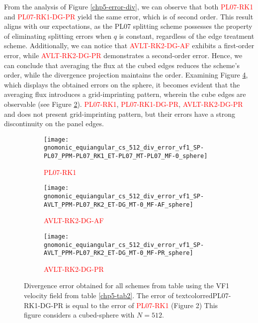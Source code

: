 From the analysis of Figure \ref{chp5-error-div}, we can observe that both \textcolor{red}{PL07-RK1} and \textcolor{red}{PL07-RK1-DG-PR} yield the same error,
which is of second order. This result aligns with our expectations, as the PL07 splitting scheme possesses the property of eliminating
splitting errors when $q$ is constant, regardless of the edge treatment scheme.
Additionally, we can notice that \textcolor{red}{AVLT-RK2-DG-AF} exhibits a first-order error, while \textcolor{red}{AVLT-RK2-DG-PR} demonstrates a second-order error.
Hence, we can conclude that averaging the flux at the cubed edges reduces the scheme's order, while the divergence projection maintains the order.
Examining Figure \ref{chp5-div}, which displays the obtained errors on the sphere, it becomes evident that the averaging
flux introduces a grid-imprinting pattern, wherein the cube edges are observable (see Figure \ref{chp5-div2}).
\textcolor{red}{PL07-RK1}, \textcolor{red}{PL07-RK1-DG-PR}, \textcolor{red}{AVLT-RK2-DG-PR} and  does not present grid-imprinting pattern, but their errors have a strong discontinuity on the panel edges.
\begin{figure}[!htb]
	\centering
	\begin{subfigure}{0.3\textwidth}
		\centering
		\texttt{[image: gnomonic\_equiangular\_cs\_512\_div\_error\_vf1\_SP-PL07\_PPM-PL07\_RK1\_ET-PL07\_MT-PL07\_MF-0\_sphere]}
		\caption{\textcolor{red}{PL07-RK1} \label{chp5-div1}}
	\end{subfigure}
	\begin{subfigure}{0.3\textwidth}
	\centering
	\texttt{[image: gnomonic\_equiangular\_cs\_512\_div\_error\_vf1\_SP-AVLT\_PPM-PL07\_RK2\_ET-DG\_MT-0\_MF-AF\_sphere]}
	\caption{\textcolor{red}{AVLT-RK2-DG-AF} \label{chp5-div2}}
	\end{subfigure}
	\begin{subfigure}{0.3\textwidth}
	\centering
	\texttt{[image: gnomonic\_equiangular\_cs\_512\_div\_error\_vf1\_SP-AVLT\_PPM-PL07\_RK2\_ET-DG\_MT-0\_MF-PR\_sphere]}
	\caption{\textcolor{red}{AVLT-RK2-DG-PR} \label{chp5-div3}}
	\end{subfigure}
	\caption{ Divergence error obtained for all schemes from table using the VF1 velocity field from table \ref{chp5-tab2}.
		The error of textcolor{red}{PL07-RK1-DG-PR} is equal to the error of \textcolor{red}{PL07-RK1} (Figure 2)
		This figure considers a cubed-sphere with $N=512$. \label{chp5-div}}
\end{figure}

